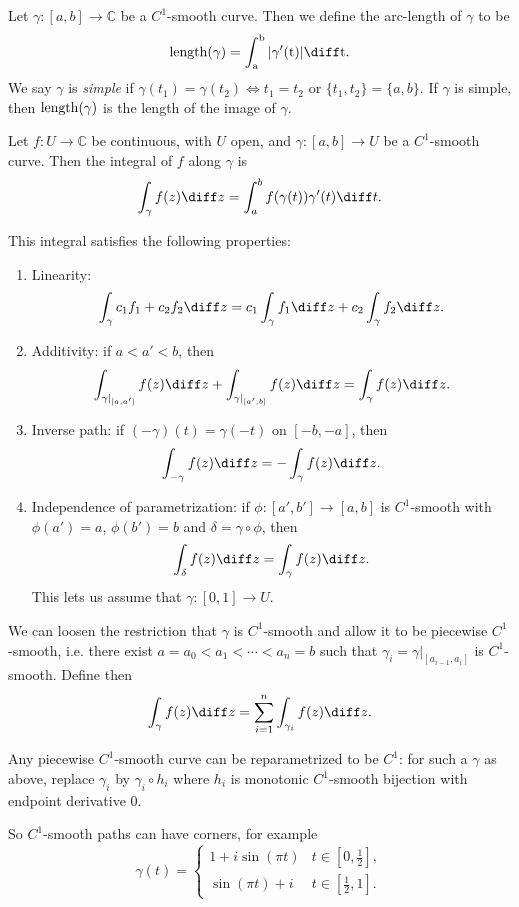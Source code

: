 \documentclass[12pt]{article}
\begin{document}
\begin{definition}
	Let $\gamma : [a, b] \to \mathbb{C}$ be a $C^{1}$-smooth curve. Then we define the arc-length of $\gamma$ to be
	\[
		\rm{length}(\gamma) = \int_{a}^{b} |\gamma'(t)| \diff t
	.\]
	We say $\gamma$ is \emph{simple} if $\gamma(t_1) = \gamma(t_2) \iff t_1 = t_2$ or $\{t_1, t_2\} = \{a, b\}$. If $\gamma$ is simple, then $\rm{length}(\gamma)$ is the length of the image of $\gamma$.
\end{definition}

\begin{definition}
	Let $f : U \to \mathbb{C}$ be continuous, with $U$ open, and $\gamma : [a, b] \to U$ be a $C^{1}$-smooth curve. Then the integral of $f$ along $\gamma$ is
	\[
	\int_{\gamma} f(z) \diff z = \int_{a}^{b} f(\gamma(t)) \gamma'(t) \diff t
	.\]
\end{definition}

This integral satisfies the following properties:
\begin{enumerate}[1.]
	\item Linearity:
		\[
		\int_{\gamma} c_1 f_1 + c_2 f_2 \diff z = c_1 \int_{\gamma}f_1 \diff z + c_2 \int_{\gamma} f_2 \diff z
		.\]
	\item Additivity: if $a < a' < b$, then
		\[
			\int_{\gamma|_{[a,a']}}f(z) \diff z + \int_{\gamma|_{[a',b]}}f(z) \diff z = \int_{\gamma} f(z) \diff z
		.\]
	\item Inverse path: if $(- \gamma)(t) = \gamma(-t)$ on $[-b, -a]$, then
		\[
		\int_{-\gamma}f(z) \diff z = - \int_{\gamma} f(z) \diff z
		.\]
	\item Independence of parametrization: if $\phi : [a', b'] \to [a, b]$ is $C^{1}$-smooth with $\phi(a') = a$, $\phi(b') = b$ and $\delta = \gamma \circ \phi$, then
		\[
		\int_{\delta}f(z) \diff z = \int_{\gamma} f(z) \diff z
		.\]
		This lets us assume that $\gamma : [0, 1] \to U$.
\end{enumerate}

We can loosen the restriction that $\gamma$ is $C^{1}$-smooth and allow it to be piecewise $C^{1}$-smooth, i.e. there exist $a = a_0 < a_1 < \cdots < a_n = b$ such that $\gamma_i = \gamma|_{[a_{i-1},a_i]}$ is $C^{1}$-smooth. Define then
\[
\int_{\gamma}f(z) \diff z = \sum_{i = 1}^{n} \int_{\gamma_i}f(z) \diff z
.\]

\begin{remark}
	Any piecewise $C^{1}$-smooth curve can be reparametrized to be $C^{1}$: for such a $\gamma$ as above, replace $\gamma_i$ by $\gamma_i \circ h_i$ where $h_i$ is monotonic $C^{1}$-smooth bijection with endpoint derivative $0$.

	So $C^{1}$-smooth paths can have corners, for example
	\[
	\gamma(t) =
	\begin{cases}
		1 + i \sin (\pi t) & t \in [0, \frac{1}{2}], \\
		\sin(\pi t) + i & t \in [\frac{1}{2}, 1].
	\end{cases}
	\]
\end{remark}
\end{document}
